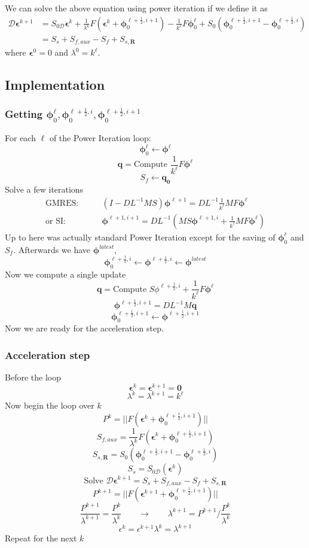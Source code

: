 \documentclass[11pt,letterpaper,notitlepage]{article}
\newcommand{\beq}{\begin{equation*}
		\begin{aligned}}
\newcommand{\eeq}{\end{aligned}
\end{equation*}}
\newcommand{\beqn}{\begin{equation}
		\begin{aligned}}
\newcommand{\eeqn}{\end{aligned}
\end{equation}}
\numberwithin{equation}{section}
\newcommand{\Linv}{L^{-1}}
\newcommand{\bphi}{\boldsymbol{\phi}}
\newcommand{\half}{\frac{1}{2}}
\newcommand{\bepsilon}{\boldsymbol{\epsilon}}
\begin{document}
We can solve the above equation using power iteration if we define it as
\beqn 
\mathcal{D} \bepsilon^{k+1} &= S_{0\mathcal{D}} \bepsilon^k + \frac{1}{\lambda^k}F(\bepsilon^k + \bphi_0^{\ell+\half,i+1}) - \frac{1}{k^\ell} F\bphi_0^\ell + S_0(\bphi_0^{\ell+\half,i+1} - \bphi_0^{\ell+\half,i}) \\
&= S_s + S_{f,aux} - S_f + S_{s,\mathbf{R}}
\eeqn 
where $\bepsilon^0 = 0$ and $\lambda^0 = k^\ell$.

\newpage
\subsection{Implementation}
\subsubsection{Getting $\bphi_0^\ell, \bphi_0^{\ell+\half,i}, \bphi_0^{\ell+\half,i+1}$}
For each $\ell$ of the Power Iteration loop:
$$
\bphi_0^\ell \leftarrow \bphi^\ell
$$
$$
\mathbf{q} = \text{Compute }\frac{1}{k^\ell} F\bphi^\ell
$$
$$
S_f \leftarrow \mathbf{q_0}
$$
Solve a few iterations
\beq 
\text{GMRES}: \quad \quad 
&(I - D\Linv MS) \bphi^{\ell+1} = D\Linv \frac{1}{k^\ell} MF\bphi^{\ell}  \\
\text{or SI}:\quad \quad  &\bphi^{\ell+1,i+1} = D\Linv (MS\bphi^{\ell+1,i} +  \frac{1}{k^\ell} MF\bphi^{\ell})
\eeq
Up to here was actually standard Power Iteration except for the saving of $\bphi_0^\ell$ and $S_f$. Afterwards we have $\bphi^{latest}$,
$$
\bphi_0^{\ell+\half,i} \leftarrow \bphi^{\ell+\half,i} \leftarrow \bphi^{latest}
$$
Now we compute a single update
$$
\mathbf{q} = \text{Compute }S\phi^{\ell+\half,i} + \frac{1}{k^\ell} F\bphi^\ell
$$
$$
\bphi^{\ell+\half,i+1} = D\Linv M\mathbf{q}
$$
$$
\bphi_0^{\ell+\half,i+1} \leftarrow \bphi^{\ell+\half,i+1}
$$
Now we are ready for the acceleration step.

\subsubsection{Acceleration step}
Before the loop
$$
\bepsilon^k = \bepsilon^{k+1} = \mathbf{0}
$$
$$
\lambda^k = \lambda^{k+1} = k^\ell
$$
Now begin the loop over $k$
$$
P^k = || F(\bepsilon^k + \bphi_0^{\ell+\half,i+1}) ||
$$
$$
S_{f,aux} = \frac{1}{\lambda^k} F(\bepsilon^k + \bphi_0^{\ell+\half,i+1})
$$
$$
S_{s,\mathbf{R}} = S_0(\bphi_0^{\ell+\half,i+1} - \bphi_0^{\ell+\half,i})
$$
$$
S_s = S_{0\mathcal{D}}(\bepsilon^k)
$$
$$
\text{Solve } \mathcal{D}\bepsilon^{k+1} = S_s + S_{f,aux} - S_f + S_{s,\mathbf{R}}
$$
$$
P^{k+1} = || F(\bepsilon^{k+1} + \bphi_0^{\ell+\half,i+1}) ||
$$
$$
\frac{P^{k+1}}{\lambda^{k+1}} = \frac{P^{k}}{\lambda^k} \quad \quad \to \quad \quad  \lambda^{k+1} = P^{k+1}/\frac{P^{k}}{\lambda^k}
$$
$$
\epsilon^k = \epsilon^{k+1}
\lambda^k = \lambda^{k+1}
$$
Repeat for the next $k$
\end{document}
